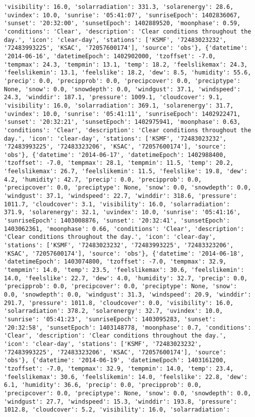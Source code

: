 \documentclass[
  letterpaper,
  DIV=11,
  numbers=noendperiod]{scrartcl}
\begin{document}
\begin{verbatim}
'visibility': 16.0, 'solarradiation': 331.3, 'solarenergy': 28.6, 'uvindex': 10.0, 'sunrise': '05:41:07', 'sunriseEpoch': 1402836067, 'sunset': '20:32:00', 'sunsetEpoch': 1402889520, 'moonphase': 0.59, 'conditions': 'Clear', 'description': 'Clear conditions throughout the day.', 'icon': 'clear-day', 'stations': ['KSMF', '72483023232', '72483993225', 'KSAC', '72057600174'], 'source': 'obs'}, {'datetime': '2014-06-16', 'datetimeEpoch': 1402902000, 'tzoffset': -7.0, 'tempmax': 24.3, 'tempmin': 13.1, 'temp': 18.2, 'feelslikemax': 24.3, 'feelslikemin': 13.1, 'feelslike': 18.2, 'dew': 8.5, 'humidity': 55.6, 'precip': 0.0, 'precipprob': 0.0, 'precipcover': 0.0, 'preciptype': None, 'snow': 0.0, 'snowdepth': 0.0, 'windgust': 37.1, 'windspeed': 24.3, 'winddir': 187.1, 'pressure': 1009.1, 'cloudcover': 9.1, 'visibility': 16.0, 'solarradiation': 369.1, 'solarenergy': 31.7, 'uvindex': 10.0, 'sunrise': '05:41:11', 'sunriseEpoch': 1402922471, 'sunset': '20:32:21', 'sunsetEpoch': 1402975941, 'moonphase': 0.63, 'conditions': 'Clear', 'description': 'Clear conditions throughout the day.', 'icon': 'clear-day', 'stations': ['KSMF', '72483023232', '72483993225', '72483323206', 'KSAC', '72057600174'], 'source': 'obs'}, {'datetime': '2014-06-17', 'datetimeEpoch': 1402988400, 'tzoffset': -7.0, 'tempmax': 28.1, 'tempmin': 11.5, 'temp': 20.2, 'feelslikemax': 26.7, 'feelslikemin': 11.5, 'feelslike': 19.8, 'dew': 4.2, 'humidity': 42.7, 'precip': 0.0, 'precipprob': 0.0, 'precipcover': 0.0, 'preciptype': None, 'snow': 0.0, 'snowdepth': 0.0, 'windgust': 37.1, 'windspeed': 22.7, 'winddir': 318.6, 'pressure': 1011.7, 'cloudcover': 3.1, 'visibility': 16.0, 'solarradiation': 371.9, 'solarenergy': 32.1, 'uvindex': 10.0, 'sunrise': '05:41:16', 'sunriseEpoch': 1403008876, 'sunset': '20:32:41', 'sunsetEpoch': 1403062361, 'moonphase': 0.66, 'conditions': 'Clear', 'description': 'Clear conditions throughout the day.', 'icon': 'clear-day', 'stations': ['KSMF', '72483023232', '72483993225', '72483323206', 'KSAC', '72057600174'], 'source': 'obs'}, {'datetime': '2014-06-18', 'datetimeEpoch': 1403074800, 'tzoffset': -7.0, 'tempmax': 32.9, 'tempmin': 14.0, 'temp': 23.5, 'feelslikemax': 30.6, 'feelslikemin': 14.0, 'feelslike': 22.7, 'dew': 4.0, 'humidity': 32.7, 'precip': 0.0, 'precipprob': 0.0, 'precipcover': 0.0, 'preciptype': None, 'snow': 0.0, 'snowdepth': 0.0, 'windgust': 31.3, 'windspeed': 20.9, 'winddir': 291.7, 'pressure': 1011.8, 'cloudcover': 0.0, 'visibility': 16.0, 'solarradiation': 378.2, 'solarenergy': 32.7, 'uvindex': 10.0, 'sunrise': '05:41:23', 'sunriseEpoch': 1403095283, 'sunset': '20:32:58', 'sunsetEpoch': 1403148778, 'moonphase': 0.7, 'conditions': 'Clear', 'description': 'Clear conditions throughout the day.', 'icon': 'clear-day', 'stations': ['KSMF', '72483023232', '72483993225', '72483323206', 'KSAC', '72057600174'], 'source': 'obs'}, {'datetime': '2014-06-19', 'datetimeEpoch': 1403161200, 'tzoffset': -7.0, 'tempmax': 32.9, 'tempmin': 14.0, 'temp': 23.4, 'feelslikemax': 30.6, 'feelslikemin': 14.0, 'feelslike': 22.8, 'dew': 6.1, 'humidity': 36.6, 'precip': 0.0, 'precipprob': 0.0, 'precipcover': 0.0, 'preciptype': None, 'snow': 0.0, 'snowdepth': 0.0, 'windgust': 27.7, 'windspeed': 15.3, 'winddir': 193.8, 'pressure': 1012.8, 'cloudcover': 5.2, 'visibility': 16.0, 'solarradiation': 
\end{verbatim}
\end{document}
